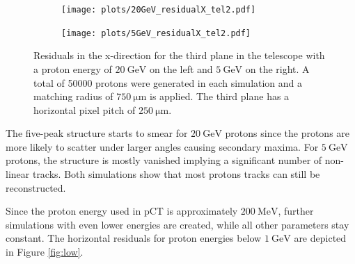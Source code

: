 \begin{figure}
  \hspace{-0.4cm}
  \begin{subfigure}{0.51\textwidth}
      \centering
      \texttt{[image: plots/20GeV\_residualX\_tel2.pdf]}
  \end{subfigure}
  \begin{subfigure}{0.51\textwidth}
      \hspace{-0.13cm}
      \texttt{[image: plots/5GeV\_residualX\_tel2.pdf]}
  \end{subfigure}
  \caption{Residuals in the x-direction for the third plane in the telescope with a proton energy of $\SI{20}{\giga\eV}$ on the left
  and $\SI{5}{\GeV}$ on the right. A total of 50000 protons were generated in each simulation and a matching radius of $\SI{750}{\micro\meter}$ is applied. The third plane has
  a horizontal pixel pitch of $\SI{250}{\micro\meter}$.}
  \label{fig:20GeV}
\end{figure}

The five-peak structure starts to smear for $\SI{20}{\giga\eV}$ protons since the protons are more likely to scatter under larger angles causing secondary maxima.
For $\SI{5}{\GeV}$ protons, the structure is mostly vanished implying a significant number of non-linear tracks. Both simulations show that most
protons tracks can still be reconstructed.

Since the proton energy used in pCT is approximately $\SI{200}{\mega\eV}$, further simulations with even lower energies are created, while all other parameters stay constant.
The horizontal residuals for proton energies below $\SI{1}{\giga\eV}$ are depicted in Figure \ref{fig:low}.

